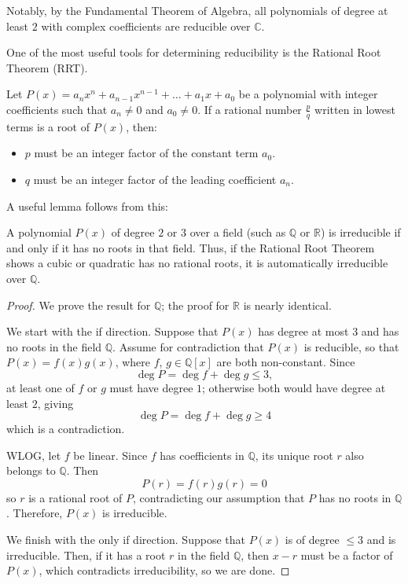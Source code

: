 \documentclass[11pt]{scrartcl}
\begin{document}
Notably, by the Fundamental Theorem of Algebra, all polynomials of degree at least $2$ with complex coefficients are reducible over $\mathbb{C}$.

One of the most useful tools for determining reducibility is the Rational Root Theorem (RRT).

\begin{theorem*}
Let $P(x) = a_n x^n + a_{n-1} x^{n-1} + \dots + a_1 x + a_0$ be a polynomial with integer coefficients such that $a_n \neq 0$ and $a_0 \neq 0$. If a rational number $\frac{p}{q}$ written in lowest terms is a root of $P(x)$, then:
\begin{itemize}
\item $p$ must be an integer factor of the constant term $a_0$.
\item $q$ must be an integer factor of the leading coefficient $a_n$.
\end{itemize}
\end{theorem*}

A useful lemma follows from this:

\begin{lemma*}
A polynomial $P(x)$ of degree $2$ or $3$ over a field (such as $\mathbb{Q}$ or $\mathbb{R}$) is irreducible if and only if it has no roots in that field. Thus, if the Rational Root Theorem shows a cubic or quadratic has no rational roots, it is automatically irreducible over $\mathbb{Q}$.
\end{lemma*}
\begin{proof}
We prove the result for $\mathbb{Q}$; the proof for $\mathbb{R}$ is nearly identical.

We start with the if direction. Suppose that $P(x)$ has degree at most $3$ and has no roots in the field $\mathbb{Q}$. Assume for contradiction that $P(x)$ is reducible, so that $P(x)=f(x)g(x)$, where $f$, $g\in\mathbb{Q}[x]$ are both non-constant. Since \[\deg P=\deg f+\deg g\le 3,\] at least one of $f$ or $g$ must have degree $1$; otherwise both would have degree at least $2$, giving \[\deg P=\deg f+\deg g\ge 4\] which is a contradiction.

WLOG, let $f$ be linear. Since $f$ has coefficients in $\mathbb{Q}$, its unique root $r$ also belongs to $\mathbb{Q}$. Then \[P(r)=f(r)g(r)=0\]so $r$ is a rational root of $P$, contradicting our assumption that $P$ has no roots in $\mathbb{Q}$. Therefore, $P(x)$ is irreducible.

We finish with the only if direction. Suppose that $P(x)$ is of degree $\leqslant 3$ and is irreducible. Then, if it has a root $r$ in the field $\mathbb{Q}$, then $x-r$ must be a factor of $P(x)$, which contradicts irreducibility, so we are done.
\end{proof}
\end{document}
